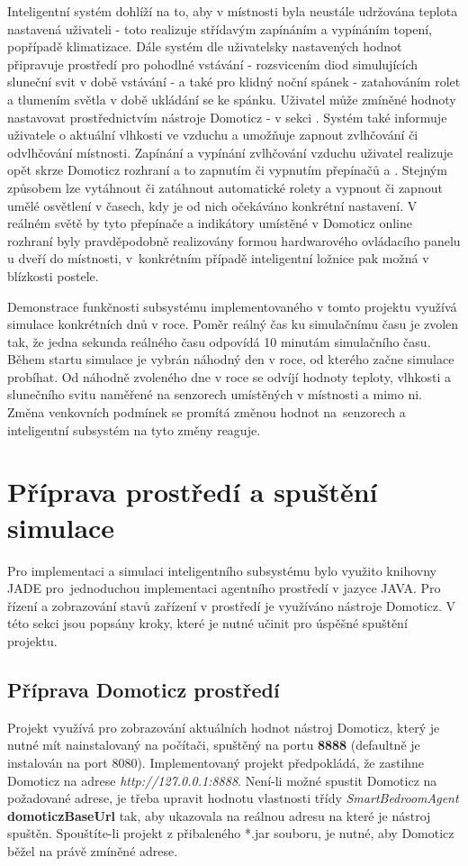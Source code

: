 \documentclass[a4paper,12pt]{article}
\begin{document}
    Inteligentní systém dohlíží na to, aby v místnosti byla neustále udržována teplota nastavená uživateli - toto realizuje střídavým zapínáním a vypínáním topení, popřípadě klimatizace. Dále systém dle uživatelsky nastavených hodnot připravuje prostředí pro pohodlné vstávání - rozsvicením diod simulujících sluneční svit v době vstávání - a také pro klidný noční spánek - zatahováním rolet a tlumením světla v době ukládání se ke spánku. Uživatel může zmíněné hodnoty nastavovat prostřednictvím nástroje Domoticz - v sekci . Systém také informuje uživatele  o aktuální vlhkosti ve vzduchu a umožňuje zapnout zvlhčování či odvlhčování místnosti. Zapínání a vypínání zvlhčování vzduchu uživatel realizuje opět skrze Domoticz rozhraní a to zapnutím či vypnutím přepínačů  a . Stejným způsobem lze vytáhnout či zatáhnout automatické rolety a vypnout či zapnout umělé osvětlení v časech, kdy je od nich očekáváno konkrétní nastavení. V reálném světě by tyto přepínače a indikátory umístěné v Domoticz online rozhraní byly pravděpodobně realizovány formou hardwarového ovládacího panelu u dveří do místnosti, v~konkrétním případě inteligentní ložnice pak možná v blízkosti postele.

    Demonstrace funkčnosti subsystému implementovaného v tomto projektu využívá simulace konkrétních dnů v roce. Poměr reálný čas ku simulačnímu času je zvolen tak, že jedna sekunda reálného času odpovídá 10 minutám simulačního času. Během startu simulace je vybrán náhodný den v roce, od kterého začne simulace probíhat. Od náhodně zvoleného dne v roce se odvíjí hodnoty teploty, vlhkosti a slunečního svitu naměřené na senzorech umístěných v místnosti a mimo ni. Změna venkovních podmínek se promítá změnou hodnot na~senzorech a inteligentní subsystém na tyto změny reaguje.


    \section{Příprava prostředí a spuštění simulace}

    Pro implementaci a simulaci inteligentního subsystému bylo využito knihovny JADE pro~jednoduchou implementaci agentního prostředí v jazyce JAVA. Pro řízení a zobrazování stavů zařízení v prostředí je využíváno nástroje Domoticz. V této sekci jsou popsány kroky, které je nutné učinit pro úspěšné spuštění projektu. 

    \subsection{Příprava Domoticz prostředí}
    Projekt využívá pro zobrazování aktuálních hodnot nástroj Domoticz, který je nutné mít nainstalovaný na počítači, spuštěný na portu \textbf{8888} (defaultně je instalován na port 8080). Implementovaný projekt předpokládá, že zastihne Domoticz na adrese \textit{http://127.0.0.1:8888}. Není-li možné spustit Domoticz na požadované adrese, je třeba upravit hodnotu vlastnosti třídy \textit{SmartBedroomAgent} \textbf{domoticzBaseUrl} tak, aby ukazovala na reálnou adresu na které je nástroj spuštěn. Spouštíte-li projekt z přibaleného *.jar souboru, je nutné, aby Domoticz běžel na právě zmíněné adrese.
\end{document}
